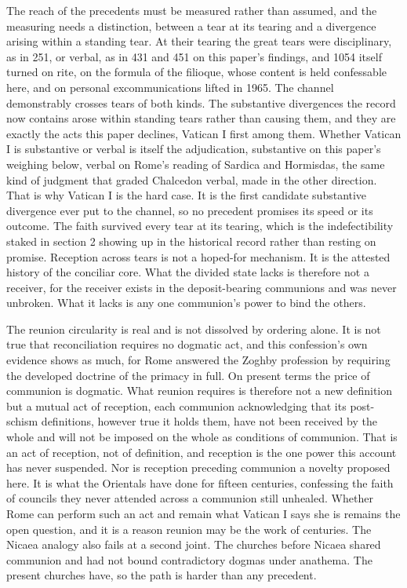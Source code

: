 \documentclass[11pt,twoside]{article}
\newcommand{\unit}[1]{\needspace{3\baselineskip}\par\medskip{\normalfont\bfseries\color{subhead}#1}\par\nobreak\smallskip}
\begin{document}
\unit{The taxonomy of tears.}
The reach of the precedents must be measured rather than assumed, and the measuring needs a distinction, between a tear at its tearing and a divergence arising within a standing tear. At their tearing the great tears were disciplinary, as in 251, or verbal, as in 431 and 451 on this paper's findings, and 1054 itself turned on rite, on the formula of the filioque, whose content is held confessable here, and on personal excommunications lifted in 1965. The channel demonstrably crosses tears of both kinds. The substantive divergences the record now contains arose within standing tears rather than causing them, and they are exactly the acts this paper declines, Vatican I first among them. Whether Vatican I is substantive or verbal is itself the adjudication, substantive on this paper's weighing below, verbal on Rome's reading of Sardica and Hormisdas, the same kind of judgment that graded Chalcedon verbal, made in the other direction. That is why Vatican I is the hard case. It is the first candidate substantive divergence ever put to the channel, so no precedent promises its speed or its outcome. The faith survived every tear at its tearing, which is the indefectibility staked in section 2 showing up in the historical record rather than resting on promise. Reception across tears is not a hoped-for mechanism. It is the attested history of the conciliar core. What the divided state lacks is therefore not a receiver, for the receiver exists in the deposit-bearing communions and was never unbroken. What it lacks is any one communion's power to bind the others.

\unit{Reunion without new definition.}
The reunion circularity is real and is not dissolved by ordering alone. It is not true that reconciliation requires no dogmatic act, and this confession's own evidence shows as much, for Rome answered the Zoghby profession by requiring the developed doctrine of the primacy in full. On present terms the price of communion is dogmatic. What reunion requires is therefore not a new definition but a mutual act of reception, each communion acknowledging that its post-schism definitions, however true it holds them, have not been received by the whole and will not be imposed on the whole as conditions of communion. That is an act of reception, not of definition, and reception is the one power this account has never suspended. Nor is reception preceding communion a novelty proposed here. It is what the Orientals have done for fifteen centuries, confessing the faith of councils they never attended across a communion still unhealed. Whether Rome can perform such an act and remain what Vatican I says she is remains the open question, and it is a reason reunion may be the work of centuries. The Nicaea analogy also fails at a second joint. The churches before Nicaea shared communion and had not bound contradictory dogmas under anathema. The present churches have, so the path is harder than any precedent.
\end{document}
